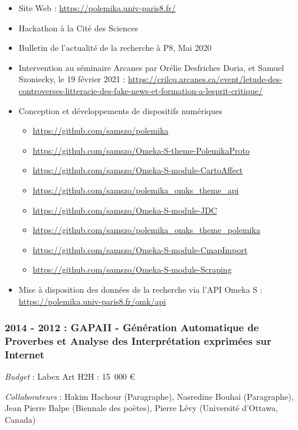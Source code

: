 \documentclass[
  a4paper,
  DIV=11,
  numbers=noendperiod]{scrreprt}
\begin{document}
\begin{itemize}
\item
  Site Web : \url{https://polemika.univ-paris8.fr/}
\item
  Hackathon à la Cité des Sciences
\item
  Bulletin de l'actualité de la recherche à P8, Mai 2020
\item
  Intervention au séminaire Arcanes par Orélie Desfriches Doria, et
  Samuel Szoniecky, le 19 février 2021 :
  \url{https://crilcq.arcanes.ca/event/letude-des-controverses-litteracie-des-fake-news-et-formation-a-lesprit-critique/}
\item
  Conception et développements de dispositifs numériques

  \begin{itemize}
  \item
    \url{https://github.com/samszo/polemika}
  \item
    \url{https://github.com/samszo/Omeka-S-theme-PolemikaProto}
  \item
    \url{https://github.com/samszo/Omeka-S-module-CartoAffect}
  \item
    \url{https://github.com/samszo/polemika_omks_theme_api}
  \item
    \url{https://github.com/samszo/Omeka-S-module-JDC} \textbar{}
  \item
    \url{https://github.com/samszo/polemika_omks_theme_polemika}
  \item
    \url{https://github.com/samszo/Omeka-S-module-CmapImport}
  \item
    \url{https://github.com/samszo/Omeka-S-module-Scraping}
  \end{itemize}
\item
  Mise à disposition des données de la recherche via l'API Omeka S :
  \url{https://polemika.univ-paris8.fr/omk/api}
\end{itemize}

\subsubsection*{2014 - 2012 : GAPAII - Génération Automatique de
Proverbes et Analyse des Interprétation exprimées sur
Internet}\label{sec-porjetGapaii}

\emph{Budget} : Labex Art H2H : 15~000 €

\emph{Collaborateurs} : Hakim Hachour (Paragraphe), Nasredine Bouhai
(Paragraphe), Jean Pierre Balpe (Biennale des poètes), Pierre Lévy
(Université d'Ottawa, Canada)
\end{document}
